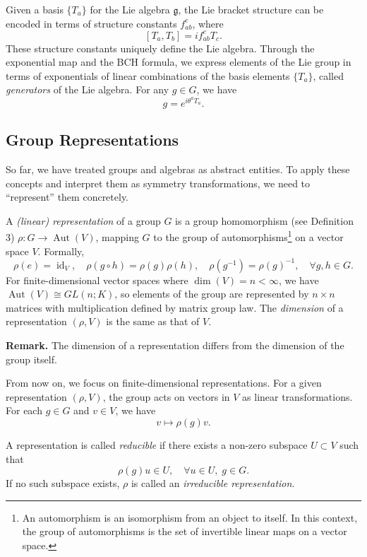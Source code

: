 Given a basis $\{ T_a \}$ for the Lie algebra $\mathfrak{g}$, the Lie bracket structure can be encoded in terms of structure constants $f^c_{ab}$, where
\[
[T_a, T_b] = i f^c_{ab} T_c.
\]
These structure constants uniquely define the Lie algebra. Through the exponential map and the BCH formula, we express elements of the Lie group in terms of exponentials of linear combinations of the basis elements $\{T_a\}$, called \emph{generators} of the Lie algebra. For any $g \in G$, we have
\[
g = e^{i \theta^a T_a}.
\]


\subsection{Group Representations}

So far, we have treated groups and algebras as abstract entities. To apply these concepts and interpret them as symmetry transformations, we need to “represent” them concretely.

\begin{definition}
A \emph{(linear) representation} of a group $G$ is a group homomorphism (see Definition 3) $\rho : G \to \operatorname{Aut}(V)$, mapping $G$ to the group of automorphisms\footnote{An automorphism is an isomorphism from an object to itself. In this context, the group of automorphisms is the set of invertible linear maps on a vector space.} on a vector space $V$. Formally, 
\[
\rho(e) = \operatorname{id}_V, \quad \rho(g \circ h) = \rho(g)\rho(h), \quad \rho(g^{-1}) = \rho(g)^{-1}, \quad \forall g, h \in G.
\]
For finite-dimensional vector spaces where $\dim(V) = n < \infty$, we have $\operatorname{Aut}(V) \cong GL(n; K)$, so elements of the group are represented by $n \times n$ matrices with multiplication defined by matrix group law. The \emph{dimension} of a representation $(\rho, V)$ is the same as that of $V$.
\end{definition}

\noindent
\textbf{Remark.} The dimension of a representation differs from the dimension of the group itself.

From now on, we focus on finite-dimensional representations. For a given representation $(\rho, V)$, the group acts on vectors in $V$ as linear transformations. For each $g \in G$ and $v \in V$, we have
\[
v \mapsto \rho(g)v.
\]

\begin{definition}
A representation is called \emph{reducible} if there exists a non-zero subspace $U \subset V$ such that
\[
\rho(g)u \in U, \quad \forall u \in U, \; g \in G.
\]
If no such subspace exists, $\rho$ is called an \emph{irreducible representation}.
\end{definition}

